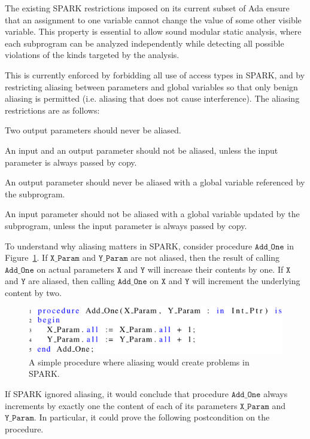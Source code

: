\documentclass[runningheads]{llncs}
\newcommand\var[1]{\ensuremath{\mathtt{#1}}}
\begin{document}
The existing SPARK restrictions imposed on its current subset of Ada ensure that an assignment to one variable cannot change the value of some other visible variable. This property is essential to allow sound modular static analysis,
where each subprogram can be analyzed independently while detecting all possible violations of the kinds targeted by the analysis.

This is currently enforced by forbidding all use of access types in SPARK, and by restricting aliasing between parameters and global variables so that only
benign aliasing is permitted (i.e. aliasing that does not cause interference).  The aliasing restrictions are as follows:

\begin{compactitem}
  \item Two output parameters should never be aliased.
  \item An input and an output parameter should not be aliased, unless the input parameter is always passed by copy.
  \item An output parameter should never be aliased with a global variable referenced by the subprogram.
  \item An input parameter should not be aliased with a global variable updated by the subprogram, unless the input parameter is always passed by copy.
\end{compactitem}

\smallskip
To understand why aliasing matters in SPARK, consider procedure \var{Add\_One} in Figure~\ref{fig:spark_ex1}. If \var{X\_Param} and \var{Y\_Param}
are not aliased, then the result of calling \var{Add\_One} on actual parameters \var{X} and \var{Y} will increase their contents by one. If \var{X} and \var{Y} are aliased, then calling
\var{Add\_One} on \var{X} and \var{Y} will increment the underlying content by two.


\begin{figure}[htb!]
\centering
  \captionsetup{justification=centering,margin=0.3cm}
   \includegraphics[]{spark_ex1}
   \caption{A simple procedure where aliasing would create problems in SPARK.}
   \label{fig:spark_ex1}
\end{figure}

If SPARK ignored aliasing, it would conclude that procedure \var{Add\_One} always increments by exactly one the content of each of its parameters \var{X\_Param} and \var{Y\_Param}.
In particular, it could prove the following postcondition on the procedure.
\end{document}
